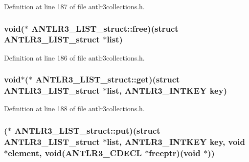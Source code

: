 Definition at line 187 of file antlr3collections.\-h.

\hypertarget{struct_a_n_t_l_r3___l_i_s_t__struct_a40cf49789eec6942fd248cb21f5c19ec}{
\subsubsection[{free}]{\setlength{\rightskip}{0pt plus 5cm}void($\ast$ A\-N\-T\-L\-R3\-\_\-\-L\-I\-S\-T\-\_\-struct\-::free)(struct {\bf A\-N\-T\-L\-R3\-\_\-\-L\-I\-S\-T\-\_\-struct} $\ast$list)}}\label{struct_a_n_t_l_r3___l_i_s_t__struct_a40cf49789eec6942fd248cb21f5c19ec}


Definition at line 186 of file antlr3collections.\-h.

\hypertarget{struct_a_n_t_l_r3___l_i_s_t__struct_ae8b4a02c7bb9cd4921cef90fd5e7a304}{
\subsubsection[{get}]{\setlength{\rightskip}{0pt plus 5cm}void$\ast$($\ast$ A\-N\-T\-L\-R3\-\_\-\-L\-I\-S\-T\-\_\-struct\-::get)(struct {\bf A\-N\-T\-L\-R3\-\_\-\-L\-I\-S\-T\-\_\-struct} $\ast$list, {\bf A\-N\-T\-L\-R3\-\_\-\-I\-N\-T\-K\-E\-Y} key)}}\label{struct_a_n_t_l_r3___l_i_s_t__struct_ae8b4a02c7bb9cd4921cef90fd5e7a304}


Definition at line 188 of file antlr3collections.\-h.

\hypertarget{struct_a_n_t_l_r3___l_i_s_t__struct_acd33ea9160558c5bf44a6aa23f5a514c}{
\subsubsection[{put}]{($\ast$ A\-N\-T\-L\-R3\-\_\-\-L\-I\-S\-T\-\_\-struct\-::put)(struct {\bf A\-N\-T\-L\-R3\-\_\-\-L\-I\-S\-T\-\_\-struct} $\ast$list, {\bf A\-N\-T\-L\-R3\-\_\-\-I\-N\-T\-K\-E\-Y} key, void $\ast$element, void({\bf A\-N\-T\-L\-R3\-\_\-\-C\-D\-E\-C\-L} $\ast$freeptr)(void $\ast$))}}\label{struct_a_n_t_l_r3___l_i_s_t__struct_acd33ea9160558c5bf44a6aa23f5a514c}


